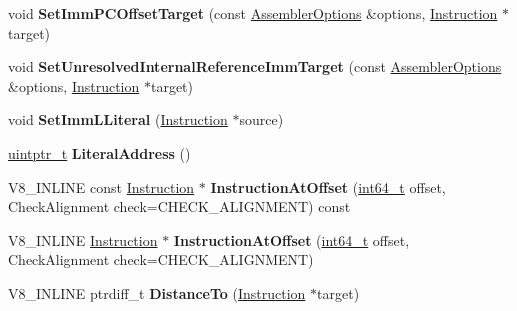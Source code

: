 \begin{DoxyCompactItemize}
void {\bfseries Set\+Imm\+P\+C\+Offset\+Target} (const \mbox{\hyperlink{structv8_1_1internal_1_1AssemblerOptions}{Assembler\+Options}} \&options, \mbox{\hyperlink{classv8_1_1internal_1_1Instruction}{Instruction}} $\ast$target)
\item 
\mbox{\label{classv8_1_1internal_1_1Instruction_a2b31b8b4eb1c51c44ec564a0d7b15390}} 
void {\bfseries Set\+Unresolved\+Internal\+Reference\+Imm\+Target} (const \mbox{\hyperlink{structv8_1_1internal_1_1AssemblerOptions}{Assembler\+Options}} \&options, \mbox{\hyperlink{classv8_1_1internal_1_1Instruction}{Instruction}} $\ast$target)
\item 
\mbox{\label{classv8_1_1internal_1_1Instruction_ac6a3f98c64d4bc69f2d5a7ecccbddb59}} 
void {\bfseries Set\+Imm\+L\+Literal} (\mbox{\hyperlink{classv8_1_1internal_1_1Instruction}{Instruction}} $\ast$source)
\item 
\mbox{\label{classv8_1_1internal_1_1Instruction_a9597e888188d3c20e82d6b00b93dbc0d}} 
\mbox{\hyperlink{classuintptr__t}{uintptr\+\_\+t}} {\bfseries Literal\+Address} ()
\item 
\mbox{\label{classv8_1_1internal_1_1Instruction_afcb06c73ab7acd74af802249ceddd06c}} 
V8\+\_\+\+I\+N\+L\+I\+NE const \mbox{\hyperlink{classv8_1_1internal_1_1Instruction}{Instruction}} $\ast$ {\bfseries Instruction\+At\+Offset} (\mbox{\hyperlink{classint64__t}{int64\+\_\+t}} offset, Check\+Alignment check=C\+H\+E\+C\+K\+\_\+\+A\+L\+I\+G\+N\+M\+E\+NT) const
\item 
\mbox{\label{classv8_1_1internal_1_1Instruction_ac4b2539339c911a2aea99746f161f9e5}} 
V8\+\_\+\+I\+N\+L\+I\+NE \mbox{\hyperlink{classv8_1_1internal_1_1Instruction}{Instruction}} $\ast$ {\bfseries Instruction\+At\+Offset} (\mbox{\hyperlink{classint64__t}{int64\+\_\+t}} offset, Check\+Alignment check=C\+H\+E\+C\+K\+\_\+\+A\+L\+I\+G\+N\+M\+E\+NT)
\item 
\mbox{\label{classv8_1_1internal_1_1Instruction_ae5f8a7f859452caae4d852c29ce59e3a}} 
V8\+\_\+\+I\+N\+L\+I\+NE ptrdiff\+\_\+t {\bfseries Distance\+To} (\mbox{\hyperlink{classv8_1_1internal_1_1Instruction}{Instruction}} $\ast$target)

\end{DoxyCompactItemize}
